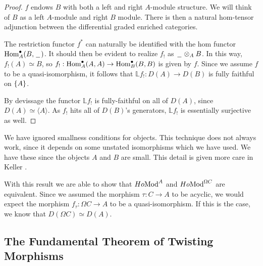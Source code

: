 \documentclass[../thesis.tex]{subfiles}
\begin{document}
            \begin{proof}
                $f$ endows $B$ with both a left and right $A$-module structure. We will think of $B$ as a left $A$-module and right $B$ module. There is then a natural hom-tensor adjunction between the differential graded enriched categories.

                \begin{center}
                \end{center}

                The restriction functor $f^*$ can naturally be identified with the hom functor $\tt{Hom}_A^\bullet(B,\argument)$. It should then be evident to realize $f_!$ as $\argument \otimes_A B$. In this way, $f_!(A) \simeq B$, so $f_! : \tt{Hom}_A^\bullet (A,A) \rightarrow \tt{Hom}_B^\bullet (B,B)$ is given by $f$. Since we assume $f$ to be a quasi-isomorphism, it follows that $\mathbb{L}f_! : D(A) \rightarrow D(B)$ is fully faithful on $\startset{A}$.

                By devissage the functor $\mathbb{L}f_!$ is fully-faithful on all of $D(A)$, since $D(A) \simeq \langle A \rangle$. As $f_!$ hits all of $D(B)$'s generators, $\mathbb{L}f_!$ is essentially surjective as well.
            \end{proof}

            \begin{remark}
                We have ignored smallness conditions for objects. This technique does not always work, since it depends on some unstated isomorphisms which we have used. We have these since the objects $A$ and $B$ are small. This detail is given more care in Keller \cite{Keller94}.
            \end{remark}
                
            With this result we are able to show that $Ho \tt{Mod}^A$ and $Ho \tt{Mod}^{\Omega C}$ are equivalent. Since we assumed the morphism $\tau: C \rightarrow A$ to be acyclic, we would expect the morphism $f_\tau : \Omega C \rightarrow A$ to be a quasi-isomorphism. If this is the case, we know that $D(\Omega C)\simeq D(A)$. 

        \subsection{The Fundamental Theorem of Twisting Morphisms}
\end{document}
